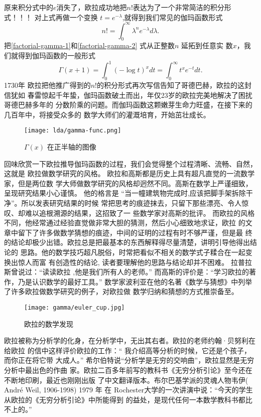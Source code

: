{原来积分式中的$e$消失了，欧拉成功地把$n!$表达为了一个非常简洁的积分形式！！！
对上式再做一个变换 $t=e^{-\lambda}$,就得到我们常见的伽玛函数形式
\begin{equation}
\label{factorial-gamma-2}
 n! = \int_0^{\infty} \lambda^ne^{-\lambda}d\lambda .
\end{equation}
把\eqref{factorial-gamma-1}和\eqref{factorial-gamma-2} 式从正整数$n$ 延拓到任意实
数$x$，我们就得到伽玛函数的一般形式
$$ \Gamma(x+1) = \int_0^1 (-\log t)^{x}dt =  \int_0^{\infty} t^{x}e^{-t}dt .$$
1730年 欧拉把他推广得到的$n!$的积分形式再次写信告知了哥德巴赫，欧拉的这封信犹如
春雷惊起千年蛰，伽玛函数破土而出，年仅23岁的欧拉完美地解决了困扰哥德巴赫多年的
分数阶乘的问题。而伽玛函数这颗嫩芽生命力旺盛，在接下来的几百年中，将接受众多的
数学大师们的灌溉培育，开始茁壮成长。 

\begin{figure}[htbp]
\centering
\texttt{[image: lda/gamma-func.png]}
\caption{$\Gamma(x)$ 在正半轴的图像}
\end{figure}

回味欣赏一下欧拉推导伽玛函数的过程，我们会觉得整个过程清晰、流畅、自然，这就是
欧拉做数学研究的风格。 欧拉和高斯都是历史上具有超凡直觉的一流数学家，但是两位数
学大师做数学研究的风格却迥然不同。高斯在数学上严谨细致，呈现研究结果小心谨慎。
他的格言是 “当一幢建筑物完成时,应该把脚手架拆除干净”。所以发表研究结果的时候
常把思考的痕迹抹去，只留下那些漂亮、令人惊叹、却难以追根溯源的结果，这招致了一
些数学家对高斯的批评。
而欧拉的风格不同，他经常通过经验直觉做非常大胆的猜测，然后小心细致地求证，欧拉
的文章中留下了许多做数学猜想的痕迹，中间的证明的过程有时不够严谨，但是最
终的结论却极少出错。欧拉总是把最基本的东西解释得尽量清楚，讲明引导他得出结论的
思路。他的数学技巧超凡脱俗，时常把看似不相关的数学式子糅合在一起变换出惊人而富
有创造性的结论, 读者要理解他的思路与结论却并不困难。
拉普拉斯曾说过：“读读欧拉 ,他是我们所有人的老师。”
而高斯的评价是：“学习欧拉的著作，乃是认识数学的最好工具。”
数学家波利亚在他的名著《数学与猜想》中列举了许多欧拉做数学研究的例子，对欧拉做
数学归纳和猜想的方式推崇备至。

\begin{figure}[htbp]
\centering
\texttt{[image: gamma/euler\_cup.jpg]}
\caption{欧拉的数学发现}
\end{figure}

欧拉被称为分析学的化身，在分析学中，无出其右者。欧拉的老师约翰·贝努利在给欧拉
的信中这样评价欧拉的工作：“ 我介绍高等分析的时候，它还是个孩子，而你正在将它带
大成人。” 希尔伯特说“分析学是无穷的交响曲”，欧拉显然是无穷分析中最出色的作曲
家。欧拉二百多年前写的教科书《无穷分析引论》至今还在不断地印刷，最近也刚刚出版
了中文翻译版本。布尔巴基学派的灵魂人物韦伊( Andr\'{e} Weil, 1906-1998) 1979 年
在 Rochester大学的一次讲演中说：“今天的学生从欧拉的《无穷分析引论》中所能得到
的益处，是现代任何一本数学教科书都比不上的。”

}

